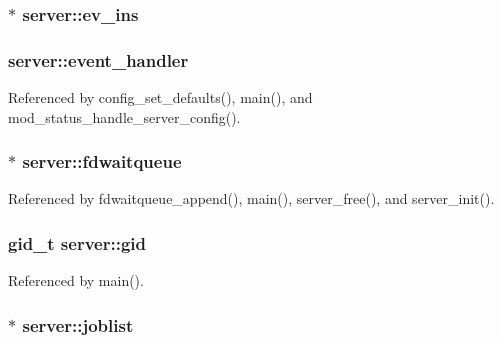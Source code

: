 \hypertarget{structserver_a57305fbd44d06ebb5eede8e6b64bdc5f}{
\subsubsection[{ev\-\_\-ins}]{ $\ast$ server\-::ev\-\_\-ins}}\label{structserver_a57305fbd44d06ebb5eede8e6b64bdc5f}
\hypertarget{structserver_abaae431ce1ccad32f1da78a9510de350}{
\subsubsection[{event\-\_\-handler}]{ server\-::event\-\_\-handler}}\label{structserver_abaae431ce1ccad32f1da78a9510de350}


Referenced by config\-\_\-set\-\_\-defaults(), main(), and mod\-\_\-status\-\_\-handle\-\_\-server\-\_\-config().

\hypertarget{structserver_ae3bb6b0e7e6984234ebc472709389f75}{
\subsubsection[{fdwaitqueue}]{$\ast$ server\-::fdwaitqueue}}\label{structserver_ae3bb6b0e7e6984234ebc472709389f75}


Referenced by fdwaitqueue\-\_\-append(), main(), server\-\_\-free(), and server\-\_\-init().

\hypertarget{structserver_af10386864ac44f42312414eb542fbd6e}{
\subsubsection[{gid}]{\setlength{\rightskip}{0pt plus 5cm}gid\-\_\-t server\-::gid}}\label{structserver_af10386864ac44f42312414eb542fbd6e}


Referenced by main().

\hypertarget{structserver_a52958de6c5ef6863634feaa2c4ea3771}{
\subsubsection[{joblist}]{$\ast$ server\-::joblist}}\label{structserver_a52958de6c5ef6863634feaa2c4ea3771}


